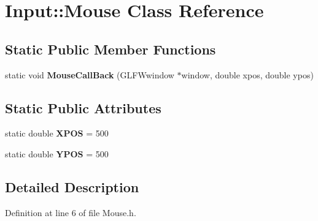 \hypertarget{class_input_1_1_mouse}{}\section{Input\+:\+:Mouse Class Reference}
\label{class_input_1_1_mouse}
\subsection*{Static Public Member Functions}
\begin{DoxyCompactItemize}
\item 
static void {\bfseries Mouse\+Call\+Back} (G\+L\+F\+Wwindow $\ast$window, double xpos, double ypos)\hypertarget{class_input_1_1_mouse_a514c5149516dcfd1e34ea1bf7fcebfbf}{}\label{class_input_1_1_mouse_a514c5149516dcfd1e34ea1bf7fcebfbf}

\end{DoxyCompactItemize}
\subsection*{Static Public Attributes}
\begin{DoxyCompactItemize}
\item 
static double {\bfseries X\+P\+OS} = 500\hypertarget{class_input_1_1_mouse_ae7ff9ac117d2bce9ee90fd8532679ca4}{}\label{class_input_1_1_mouse_ae7ff9ac117d2bce9ee90fd8532679ca4}

\item 
static double {\bfseries Y\+P\+OS} = 500\hypertarget{class_input_1_1_mouse_a1f78f6147d1ea6373bb8dfed631d4da8}{}\label{class_input_1_1_mouse_a1f78f6147d1ea6373bb8dfed631d4da8}

\end{DoxyCompactItemize}


\subsection{Detailed Description}


Definition at line 6 of file Mouse.\+h.

